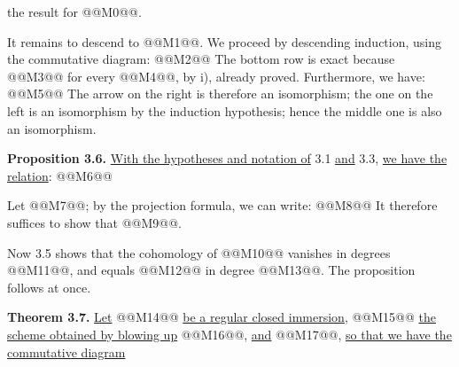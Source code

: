 the result for @@M0@@.

It remains to descend to @@M1@@. We proceed by descending induction, using the commutative diagram:
@@M2@@
The bottom row is exact because @@M3@@ for every @@M4@@, by i), already proved. Furthermore, we have:
@@M5@@
The arrow on the right is therefore an isomorphism; the one on the left is an isomorphism by the induction hypothesis; hence the middle one is also an isomorphism.

\textbf{Proposition 3.6.} \uline{With the hypotheses and notation of} 3.1 \uline{and} 3.3, \uline{we have the relation}:
@@M6@@

Let @@M7@@; by the projection formula, we can write:
@@M8@@
It therefore suffices to show that @@M9@@.

Now 3.5 shows that the cohomology of @@M10@@ vanishes in degrees @@M11@@, and equals @@M12@@ in degree @@M13@@. The proposition follows at once.

\textbf{Theorem 3.7.} \uline{Let} @@M14@@ \uline{be a regular closed immersion}, @@M15@@ \uline{the scheme obtained by blowing up} @@M16@@, \uline{and} @@M17@@, \uline{so that we have the commutative diagram}
